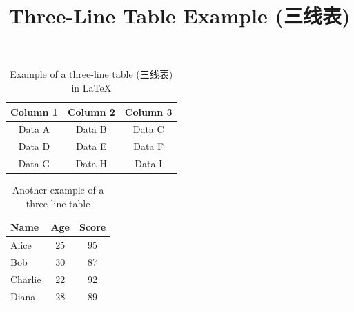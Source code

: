 \documentclass{article}
\begin{document}
\title{Three-Line Table Example (三线表)}
\maketitle

\begin{table}[h]
\centering
\begin{tabular}{ccc}
\toprule
Column 1 & Column 2 & Column 3 \\
\midrule
Data A & Data B & Data C \\
Data D & Data E & Data F \\
Data G & Data H & Data I \\
\bottomrule
\end{tabular}
\caption{Example of a three-line table (三线表) in LaTeX}
\label{tab:example}
\end{table}

\begin{table}[h]
\centering
\begin{tabular}{lcc}
\toprule
Name & Age & Score \\
\midrule
Alice & 25 & 95 \\
Bob & 30 & 87 \\
Charlie & 22 & 92 \\
Diana & 28 & 89 \\
\bottomrule
\end{tabular}
\caption{Another example of a three-line table}
\label{tab:example2}
\end{table}
\end{document}
